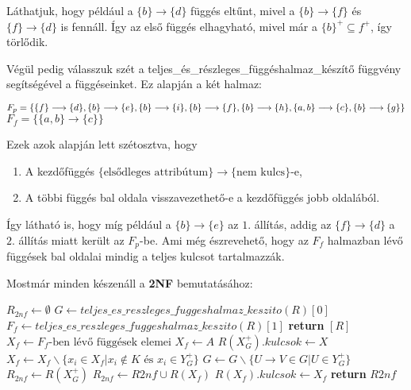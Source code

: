 \begin{pld}
Láthatjuk, hogy például a $\{b\} \longrightarrow \{d\}$ függés eltűnt, mivel a  $\{b\} \longrightarrow \{f\}$ és $\{f\} \longrightarrow \{d\}$ is fennáll. Így az első függés elhagyható, mivel már a $\{b\}^+ \subseteq {f}^+$, így törlődik. 

Végül pedig válasszuk szét a teljes\_és\_részleges\_függéshalmaz\_készítő függvény segítségével a függéseinket. Ez alapján a két halmaz:

\begin{center}
    $F_p = \{ \{f\} \longrightarrow \{d\}, 
    \{b\} \longrightarrow \{e\}, 
    \{b\} \longrightarrow \{i\},
    \{b\} \longrightarrow \{f\}, \break
    \{b\} \longrightarrow \{h\}, 
    \{a,b\} \longrightarrow \{c\}, 
    \{b\} \longrightarrow \{g\} \}$ \break
    $F_f = \{\{a,b\} \longrightarrow \{c\} \}$
\end{center}

Ezek azok alapján lett szétosztva, hogy
\begin{enumerate}
    \item A kezdőfüggés $\{ \text{elsődleges attribútum} \} \longrightarrow \{ \text{nem kulcs}\}$-e,
    \item A többi függés bal oldala visszavezethető-e a kezdőfüggés jobb oldalából.
\end{enumerate}

Így látható is, hogy míg például a $\{b\} \longrightarrow \{e\}$ az $1.$ állítás, addig az $\{f\} \longrightarrow \{d\}$ a $2.$ állítás miatt került az $F_p$-be. Ami még észrevehető, hogy az $F_f$ halmazban lévő függések bal oldalai mindig a teljes kulcsot tartalmazzák.
\end{pld}

Mostmár minden készenáll a \textbf{2NF} bemutatásához:

\begin{algorithmic}
        \State $R_{2nf} \gets \emptyset$
        \State $G \gets teljes\_es\_reszleges\_fuggeshalmaz\_keszito(R)[0]$
        \State $F_f \gets teljes\_es\_reszleges\_fuggeshalmaz\_keszito(R)[1]$
            \State \textbf{return} $[R]$
        \EndIf
            \State $X_f \gets F_f \text{-ben lévő függések elemei}$
        \Else
            \State $X_f \gets A$
        \EndIf
                \State $R(X^+_G).kulcsok \gets X$
                \State $X_f \gets X_f \backslash \{x_i \in X_f \big | x_i \not \in K \text{ és } x_i \in Y_G^+ \}$
                \State $G \gets G \backslash \{ U \rightarrow V \in G \big | U \in Y_G^+ \}$
                \State $R_{2nf} \gets R(X^+_G)$
            \EndIf
        \EndFor
        \State $R_{2nf} \gets R2nf \cup R(X_f)$
        \State $R(X_f).kulcsok \gets X_f$
        \State \textbf{return} $R2nf$
    \EndFunction
\end{algorithmic}


